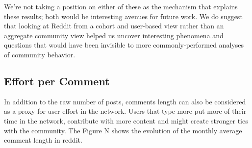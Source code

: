 We're not taking a position on either of these as the mechanism that explains these results; both would be interesting avenues for future work.  We do suggest that looking at Reddit from a cohort and user-based view rather than an aggregate community view helped us uncover interesting phenomena and questions that would have been invisible to more commonly-performed analyses of community behavior. 






\subsection{Effort per Comment}

In addition to the raw number of posts, comments length can also be considered as a proxy for user effort in the network. Users that type more put more of their time in the network, contribute with more content and might create stronger ties with the community. The Figure N shows the evolution of the monthly average comment length in reddit.

